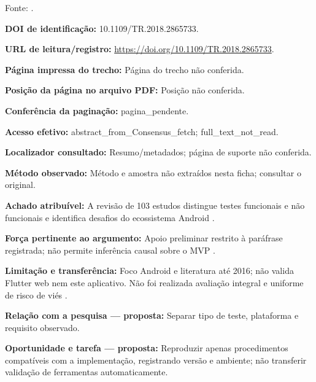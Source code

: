 Fonte: \citet{eng01}.

\noindent\textbf{DOI de identificação:} 10.1109/TR.2018.2865733.\par\medskip

\noindent\textbf{URL de leitura/registro:} \url{https://doi.org/10.1109/TR.2018.2865733}.\par\medskip

\noindent\textbf{Página impressa do trecho:} Página do trecho não conferida.\par\medskip

\noindent\textbf{Posição da página no arquivo PDF:} Posição não conferida.\par\medskip

\noindent\textbf{Conferência da paginação:} pagina\_pendente.\par\medskip

\noindent\textbf{Acesso efetivo:} abstract\_from\_Consensus\_fetch; full\_text\_not\_read.\par\medskip

\noindent\textbf{Localizador consultado:} Resumo/metadados; página de suporte não conferida.\par\medskip

\noindent\textbf{Método observado:} Método e amostra não extraídos nesta ficha; consultar o original.\par\medskip

\noindent\textbf{Achado atribuível:} A revisão de 103 estudos distingue testes funcionais e não funcionais e identifica desafios do ecossistema Android \citep{eng01}.\par\medskip

\noindent\textbf{Força pertinente ao argumento:} Apoio preliminar restrito à paráfrase registrada; não permite inferência causal sobre o MVP \citep{eng01}.\par\medskip

\noindent\textbf{Limitação e transferência:} Foco Android e literatura até 2016; não valida Flutter web nem este aplicativo. Não foi realizada avaliação integral e uniforme de risco de viés \citep{eng01}.\par\medskip

\noindent\textbf{Relação com a pesquisa — proposta:} Separar tipo de teste, plataforma e requisito observado.\par\medskip

\noindent\textbf{Oportunidade e tarefa — proposta:} Reproduzir apenas procedimentos compatíveis com a implementação, registrando versão e ambiente; não transferir validação de ferramentas automaticamente.\par\medskip

